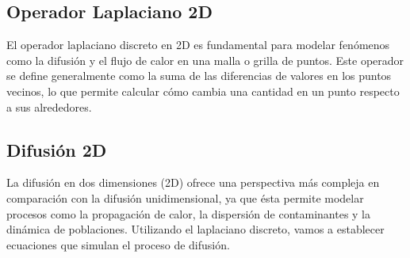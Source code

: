 \subsection{Operador Laplaciano 2D}
\label{Intro_laplaciano2D}
El operador laplaciano discreto en 2D es fundamental para modelar fenómenos como la difusión y el flujo de calor en una malla o grilla de puntos. Este operador se define generalmente como la suma de las diferencias de valores en los puntos vecinos, lo que permite calcular cómo cambia una cantidad en un punto respecto a sus alrededores.

\subsection{Difusión 2D}
\label{Intro_difusion2D}
 La difusión en dos dimensiones (2D) ofrece una perspectiva más compleja en comparación con la difusión unidimensional, ya que ésta permite modelar procesos como la propagación de calor, la dispersión de contaminantes y la dinámica de poblaciones. Utilizando el laplaciano discreto, vamos a establecer ecuaciones que simulan el proceso de difusión.